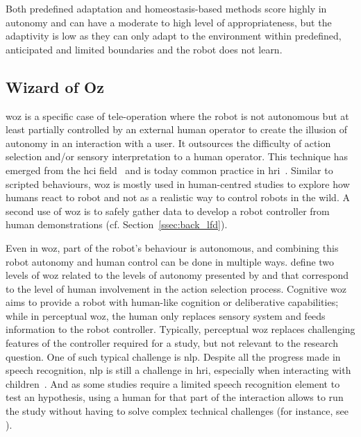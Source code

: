 	
	Both predefined adaptation and homeostasis-based methods score highly in autonomy and can have a moderate to high level of appropriateness, but the adaptivity is low as they can only adapt to the environment within predefined, anticipated and limited boundaries and the robot does not learn.

\subsection{Wizard of Oz} \label{subsec:WoZ}

	\acrfull{woz} is a specific case of tele-operation where the robot is not autonomous but at least partially controlled by an external human operator to create the illusion of autonomy in an interaction with a user. It outsources the difficulty of action selection and/or sensory interpretation to a human operator. This technique has emerged from the \gls{hci} field~\citep{kelley1983empirical} and is today common practice in \gls{hri}~\citep{riek2012wizard}. Similar to scripted behaviours, \gls{woz} is mostly used in human-centred studies to explore how humans react to robot and not as a realistic way to control robots in the wild. A second use of \gls{woz} is to safely gather data to develop a robot controller from human demonstrations (cf. Section~\ref{ssec:back_lfd}).
	
	Even in \gls{woz}, part of the robot's behaviour is autonomous, and combining this robot autonomy and human control can be done in multiple ways. \cite{baxter2016characterising} define two levels of \gls{woz} related to the levels of autonomy presented by \cite{beer2014toward} and that correspond to the level of human involvement in the action selection process. Cognitive \gls{woz} aims to provide a robot with human-like cognition or deliberative capabilities; while in perceptual \gls{woz}, the human only replaces sensory system and feeds information to the robot controller. Typically, perceptual \gls{woz} replaces challenging features of the controller required for a study, but not relevant to the research question. One of such typical challenge is \gls{nlp}. Despite all the progress made in speech recognition, \gls{nlp} is still a challenge in \gls{hri}, especially when interacting with children~\citep{kennedy2017child}. And as some studies require a limited speech recognition element to test an hypothesis, using a human for that part of the interaction allows to run the study without having to solve complex technical challenges (for instance, see \citealt{cakmak2010designing}).

